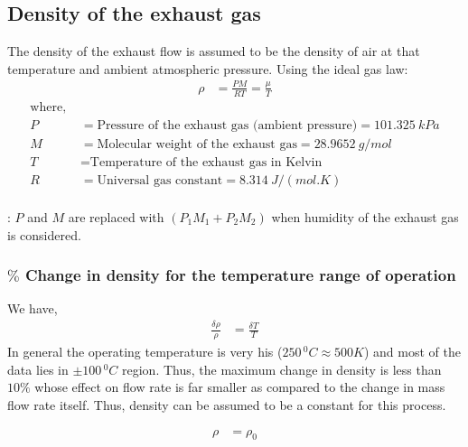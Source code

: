 \subsection{Density of the exhaust gas}

The density of the exhaust flow is assumed to be the density of air at that
temperature and ambient atmospheric pressure. Using the ideal gas law:
\begin{align}
    \rho &= \frac{PM}{R T} = \frac{\mu}{T}
\end{align}
\begin{align*}
    \text{where, } &\\
    P &= \text{Pressure of the exhaust gas (ambient pressure)} = 101.325 \: kPa\\
    M &= \text{Molecular weight of the exhaust gas} = 28.9652 \: g/mol\\
    T &= \text{Temperature of the exhaust gas in Kelvin}\\
    R &= \text{Universal gas constant} = 8.314 \: J/(mol.K)\\
\end{align*}

: $P$ and $M$ are replaced with $(P_1 M_1 + P_2 M_2)$ when humidity of the exhaust gas is considered.

\subsubsection{$\%$ Change in density for the temperature range of operation}
We have,
\begin{align*}
    \frac{\delta \rho}{\rho} &= \frac{\delta T}{T}
\end{align*}
In general the operating temperature is very his ($250 \,^0 C \approx 500 K$) and most of the data lies in $\pm 100 \, ^0 C$ region. Thus, the maximum change in density is less than $10\%$ whose effect on flow rate is far smaller as compared to the change in mass flow rate itself. Thus, density can be assumed to be a constant for this process.

\begin{align}
    \rho &= \rho_0
\end{align}



